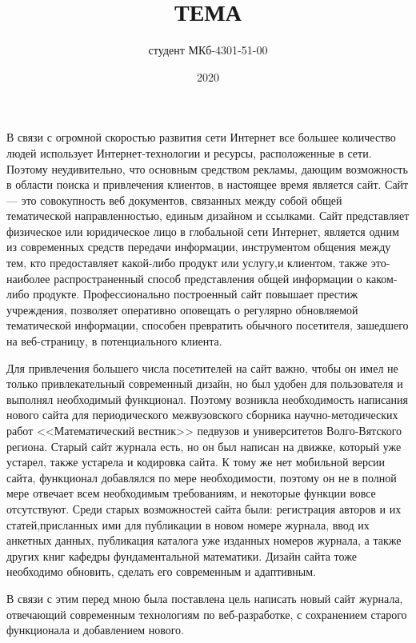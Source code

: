 \documentclass[14pt,Diplom]{diplomwork}
\date{2020}
\author{студент МКб-4301-51-00}{СВОЕ ИМЯ}
\institute{математики и информационных систем}
\title{ТЕМА}
\begin{document}
\maketitle
\newpage

\tableofcontents


В связи с огромной скоростью развития сети Интернет все большее количество людей использует Интернет-технологии и ресурсы, расположенные в сети. Поэтому неудивительно, что основным средством рекламы, дающим возможность в области поиска и привлечения клиентов, в настоящее время является сайт. Сайт --- это совокупность веб документов, связанных между собой общей тематической направленностью, единым дизайном и ссылками. Сайт представляет физическое или юридическое лицо в глобальной сети Интернет, является одним из современных средств передачи информации, инструментом общения между тем, кто предоставляет какой-либо продукт или  услугу,и клиентом, также это-наиболее распространенный способ представления общей информации о каком-либо продукте. Профессионально построенный сайт повышает престиж учреждения, позволяет оперативно оповещать о регулярно обновляемой тематической информации, способен превратить обычного посетителя, зашедшего на веб-страницу, в потенциального клиента.
 
Для привлечения большего числа посетителей на сайт важно, чтобы он имел не только привлекательный современный дизайн, но был удобен для пользователя и выполнял необходимый функционал. Поэтому возникла необходимость написания нового сайта для периодического межвузовского сборника научно-методических работ <<Математический вестник>> педвузов и университетов Волго-Вятского региона. Старый сайт журнала есть, но он был написан на движке, который уже устарел, также устарела и кодировка сайта. К тому же нет мобильной версии сайта, функционал добавлялся по мере необходимости, поэтому он не в полной мере отвечает всем необходимым требованиям, и некоторые функции вовсе отсутствуют. Среди старых возможностей сайта были: регистрация авторов и их статей,присланных ими для публикации в новом номере журнала, ввод их анкетных данных, публикация каталога уже изданных номеров журнала, а также других книг кафедры фундаментальной математики. Дизайн сайта тоже необходимо обновить, сделать его современным и адаптивным. 

В связи с этим перед мною была поставлена цель написать новый сайт журнала, отвечающий современным технологиям по веб-разработке, с сохранением старого функционала и добавлением нового. 
\end{document}
